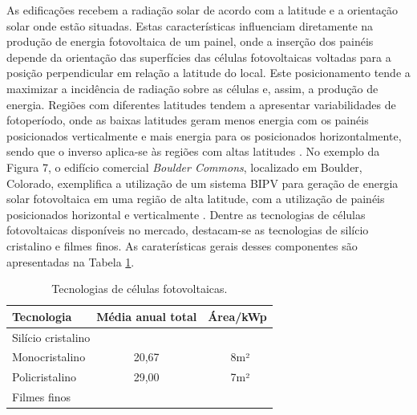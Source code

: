 \begin{onehalfspace}
    \noindent As edificações recebem a radiação solar de acordo com a latitude e a orientação solar onde estão situadas. 
    Estas características influenciam diretamente na produção de energia fotovoltaica de um painel, onde a 
    inserção dos painéis depende da orientação das superfícies das células fotovoltaicas voltadas para a posição 
    perpendicular em relação a latitude do local. Este posicionamento tende a maximizar a incidência de radiação 
    sobre as células e, assim, a produção de energia. Regiões com diferentes latitudes tendem a apresentar 
    variabilidades de fotoperíodo, onde as baixas latitudes geram menos energia com os painéis posicionados 
    verticalmente e mais energia para os posicionados horizontalmente, sendo que o inverso aplica-se às regiões 
    com altas latitudes \cite{Pereira2017}.\vspace{0.3cm} \newline
    No exemplo da Figura 7, o edifício comercial \textit{Boulder Commons}, localizado em Boulder, Colorado, 
    exemplifica a utilização de um sistema BIPV para geração de energia solar fotovoltaica em uma região de 
    alta latitude, com a utilização de painéis posicionados horizontal e verticalmente \cite{AmericanSocietyofHeatingRefrigeratingandAir-ConditioningEngineers-ASHRAE2019,Pereira2017}.
    Dentre as tecnologias de células fotovoltaicas disponíveis no mercado, destacam-se as tecnologias de 
    silício cristalino e filmes finos. As caraterísticas gerais desses componentes são apresentadas na Tabela \ref{tab:tabela1}.
        \begin{table}[ht]\centering
            \caption{\small Tecnologias de células fotovoltaicas.}
            \vspace*{0.2cm}
            \label{tab:tabela1}
            \begin{tabular}{lcc}
            \hline
            \textbf{Tecnologia}                     & \textbf{Média anual total}    & \textbf{Área/kWp} \\ \hline
            \multicolumn{3}{l}{Silício cristalino}                                                    \\ \hline
            Monocristalino                          & 20,67                         & ~8m²              \\ \hline
            Policristalino                          & 29,00                         & ~7m²              \\ \hline
            \multicolumn{3}{l}{Filmes finos}                                                          \\ \hline

\end{tabular}
\end{table}
\end{onehalfspace}
